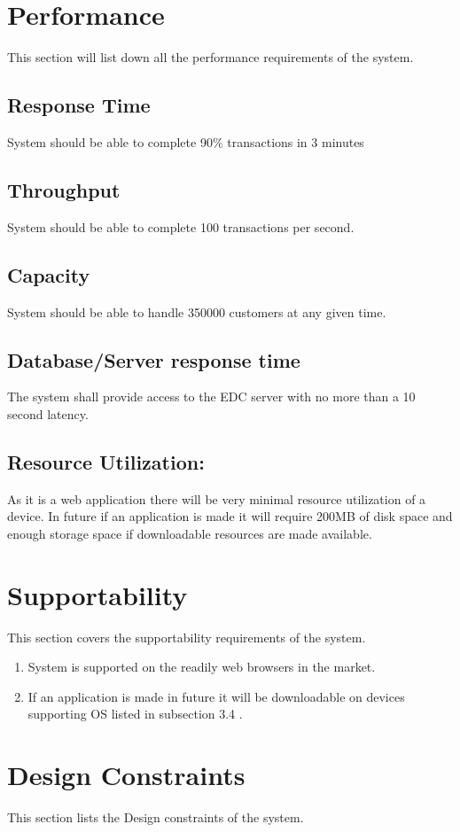 \documentclass{report}
\begin{document}
\section{ Performance}
This section will list down all the performance requirements of the system.
\subsection{Response Time}
System should be able to complete 90\% transactions in 3 minutes
\subsection{Throughput}
System should be able to complete 100 transactions per second.
\subsection{Capacity}
System should be able to handle 350000 customers at any given time.
\subsection{Database/Server response time}
The system shall provide access to the EDC server with no more than a 10 second latency.
\subsection{Resource Utilization:} As it is a web application there will be very minimal resource utilization of a device. In future if an application is made it will require 200MB of disk space and enough storage space if downloadable resources are made available.

\section{ Supportability}
This section covers the supportability requirements of the system.
\begin{enumerate}
    \item System is supported on the readily web browsers in the market.
    \item If an application is made in future it will be downloadable on devices supporting OS listed in subsection 3.4 .
\end{enumerate}

\section{ Design Constraints}
This section lists the Design constraints of the system.
\end{document}
